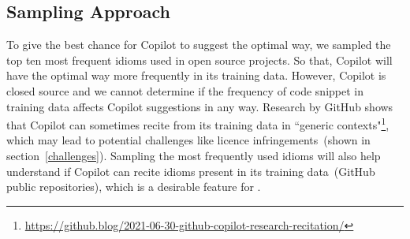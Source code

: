 \subsection{Sampling Approach}
\label{sampling}
To give the best chance for Copilot to suggest the optimal way, we sampled the top ten most frequent idioms used in open source projects. So that, Copilot will have the optimal way more frequently in its training data. However, Copilot is closed source and we cannot determine if the frequency of code snippet in training data affects Copilot suggestions in any way. Research by GitHub shows that Copilot can sometimes recite from its training data in ``generic contexts"\footnote{\url{https://github.blog/2021-06-30-github-copilot-research-recitation/}}, which may lead to potential challenges like licence infringements~(shown in section~\ref{challenges}). Sampling the most frequently used idioms will also help understand if Copilot can recite idioms present in its training data~(GitHub public repositories), which is a desirable feature for \cct{}.




